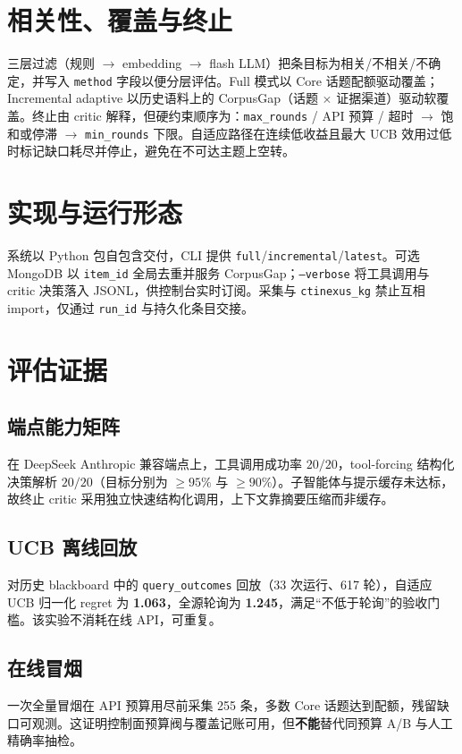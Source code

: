 \documentclass[conference]{IEEEtran}
\newcommand{\code}[1]{\texttt{\small #1}}
\begin{document}
\section{相关性、覆盖与终止}
\label{sec:relevance}

三层过滤（规则 $\rightarrow$ embedding $\rightarrow$ flash LLM）把条目标为相关/不相关/不确定，并写入 \code{method} 字段以便分层评估。Full 模式以 Core 话题配额驱动覆盖；Incremental adaptive 以历史语料上的 CorpusGap（话题 $\times$ 证据渠道）驱动软覆盖。终止由 critic 解释，但硬约束顺序为：\code{max\_rounds} / API 预算 / 超时 $\rightarrow$ 饱和或停滞 $\rightarrow$ \code{min\_rounds} 下限。自适应路径在连续低收益且最大 UCB 效用过低时标记缺口耗尽并停止，避免在不可达主题上空转。

\section{实现与运行形态}
\label{sec:impl}

系统以 Python 包自包含交付，CLI 提供 \code{full}/\code{incremental}/\code{latest}。可选 MongoDB 以 \code{item\_id} 全局去重并服务 CorpusGap；\code{--verbose} 将工具调用与 critic 决策落入 JSONL，供控制台实时订阅。采集与 \texttt{ctinexus\_kg} 禁止互相 import，仅通过 \code{run\_id} 与持久化条目交接。

\section{评估证据}
\label{sec:eval}

\subsection{端点能力矩阵}
在 DeepSeek Anthropic 兼容端点上，工具调用成功率 $20/20$，tool-forcing 结构化决策解析 $20/20$（目标分别为 $\ge 95\%$ 与 $\ge 90\%$）。子智能体与提示缓存未达标，故终止 critic 采用独立快速结构化调用，上下文靠摘要压缩而非缓存。

\subsection{UCB 离线回放}
对历史 blackboard 中的 \code{query\_outcomes} 回放（33 次运行、617 轮），自适应 UCB 归一化 regret 为 \textbf{1.063}，全源轮询为 \textbf{1.245}，满足“不低于轮询”的验收门槛。该实验不消耗在线 API，可重复。

\subsection{在线冒烟}
一次全量冒烟在 API 预算用尽前采集 255 条，多数 Core 话题达到配额，残留缺口可观测。这证明控制面预算阀与覆盖记账可用，但\textbf{不能}替代同预算 A/B 与人工精确率抽检。
\end{document}
